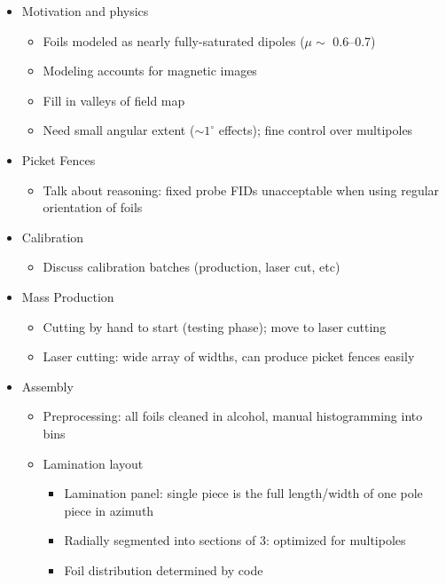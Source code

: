 \begin{itemize}
   \item Motivation and physics 
         \begin{itemize}
            \item Foils modeled as nearly fully-saturated dipoles ($\mu \sim$ 0.6--0.7) 
            \item Modeling accounts for magnetic images  
            \item Fill in valleys of field map 
            \item Need small angular extent ($\sim 1^{\circ}$ effects); fine control over multipoles 
         \end{itemize}  
   \item Picket Fences 
         \begin{itemize}
            \item Talk about reasoning: fixed probe FIDs unacceptable when 
                  using regular orientation of foils 
         \end{itemize} 
   \item Calibration 
         \begin{itemize} 
            \item Discuss calibration batches (production, laser cut, etc)  
         \end{itemize}
   \item Mass Production 
         \begin{itemize} 
            \item Cutting by hand to start (testing phase); move to laser cutting 
            \item Laser cutting: wide array of widths, can produce picket fences easily 
         \end{itemize}  
   \item Assembly
         \begin{itemize}
            \item Preprocessing: all foils cleaned in alcohol, manual histogramming into bins
            \item Lamination layout
                  \begin{itemize}
                     \item Lamination panel: single piece is the full length/width of one pole piece in azimuth 
                     \item Radially segmented into sections of 3: optimized for multipoles 
                     \item Foil distribution determined by code 

\end{itemize}
\end{itemize}
\end{itemize}
